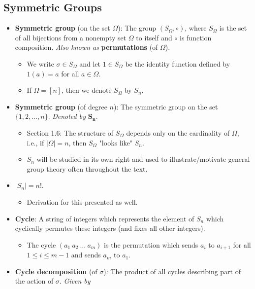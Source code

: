 \documentclass[../notes.tex]{subfiles}
\begin{document}
\subsection*{Symmetric Groups}
\begin{itemize}
    \item \textbf{Symmetric group} (on the set $\Omega$): The group $(S_\Omega,\circ)$, where $S_\Omega$ is the set of all bijections from a nonempty set $\Omega$ to itself and $\circ$ is function composition. \emph{Also known as} \textbf{permutations} (of $\Omega$).
    \begin{itemize}
        \item We write $\sigma\in S_\Omega$ and let $1\in S_\Omega$ be the identity function defined by $1(a)=a$ for all $a\in\Omega$.
        \item If $\Omega=[n]$, then we denote $S_\Omega$ by $S_n$.
    \end{itemize}
    \item \textbf{Symmetric group} (of degree $n$): The symmetric group on the set $\{1,2,\dots,n\}$. \emph{Denoted by} $\bm{S_n}$.
    \begin{itemize}
        \item Section 1.6: The structure of $S_\Omega$ depends only on the cardinality of $\Omega$, i.e., if $|\Omega|=n$, then $S_\Omega$ "looks like" $S_n$.
        \item $S_n$ will be studied in its own right and used to illustrate/motivate general group theory often throughout the text.
    \end{itemize}
    \item $|S_n|=n!$.
    \begin{itemize}
        \item Derivation for this presented as well.
    \end{itemize}
    \item \textbf{Cycle}: A string of integers which represents the element of $S_n$ which cyclically permutes these integers (and fixes all other integers).
    \begin{itemize}
        \item The cycle $(a_1\ a_2\ \dots\ a_m)$ is the permutation which sends $a_i$ to $a_{i+1}$ for all $1\leq i\leq m-1$ and sends $a_m$ to $a_1$.
    \end{itemize}
    \item \textbf{Cycle decomposition} (of $\sigma$): The product of all cycles describing part of the action of $\sigma$. \emph{Given by}
    \begin{equation*}

\end{equation*}
\end{itemize}
\end{document}
